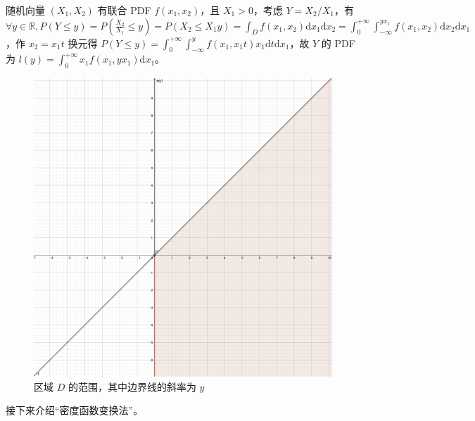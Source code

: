 \documentclass[../main.tex]{subfiles}
\begin{document}
\begin{example}
随机向量 $(X_1,X_2)$ 有联合 PDF $f(x_1,x_2)$，且 $X_1>0$，考虑 $Y=X_2/X_1$，有 $\forall y\in\mathbb R,P(Y\leq y)=P(\frac{X_2}{X_1}\leq y)=P(X_2\leq X_1y)=\int_Df(x_1,x_2)\mathrm dx_1\mathrm dx_2=\int_0^{+\infty}\int_{-\infty}^{yx_1}f(x_1,x_2)\mathrm dx_2\mathrm dx_1$，作 $x_2=x_1t$ 换元得 $P(Y\leq y)=\int_0^{+\infty}\int_{-\infty}^yf(x_1,x_1t)x_1\mathrm dt\mathrm dx_1$，故 $Y$ 的 PDF 为 $l(y)=\int_0^{+\infty}x_1f(x_1,yx_1)\mathrm dx_1$。

\begin{figure}[!h]
    \centering
    \includegraphics[scale=0.03]{figures/D_area.png}
    \caption{区域 $D$ 的范围，其中边界线的斜率为 $y$}
    \label{fig:3.7.1}
\end{figure}

\end{example}

接下来介绍“密度函数变换法”。
\end{document}
